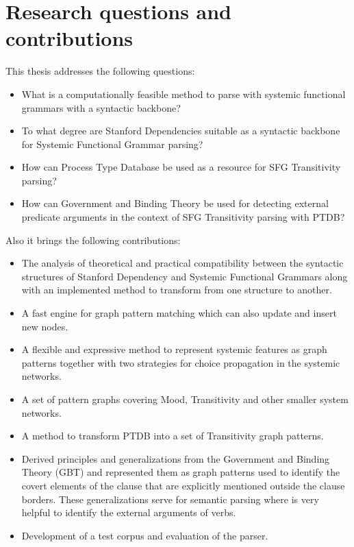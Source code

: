 \section{Research questions and contributions} %
This thesis addresses the following questions:
\begin{itemize}
	\item What is a computationally feasible method to parse with systemic functional grammars with a syntactic backbone?
	\item To what degree are Stanford Dependencies suitable as a syntactic backbone for Systemic Functional Grammar parsing? 
	\item How can Process Type Database be used as a resource for SFG Transitivity parsing?
	\item How can Government and Binding Theory be used for detecting external predicate arguments in the context of SFG Transitivity parsing with PTDB?
\end{itemize}

Also it brings the following contributions:
\begin{itemize}
	\item The analysis of theoretical and practical compatibility between the syntactic structures of Stanford Dependency and Systemic Functional Grammars along with an implemented method to transform from one structure to another.
	\item A fast engine for graph pattern matching which can also update and insert new nodes.
	\item A flexible and expressive method to represent systemic features as graph patterns together with two strategies for choice propagation in the systemic networks.
	\item A set of pattern graphs covering Mood, Transitivity and other smaller system networks.
	\item A method to transform PTDB into a set of Transitivity graph patterns. 
	\item Derived principles and generalizations from the Government and Binding Theory (GBT) and represented them as graph patterns used to identify the covert elements of the clause that are explicitly mentioned outside the clause borders. These generalizations serve for semantic parsing where is very helpful to identify the external arguments of verbs.
	\item Development of a test corpus and evaluation of the parser.
\end{itemize}

